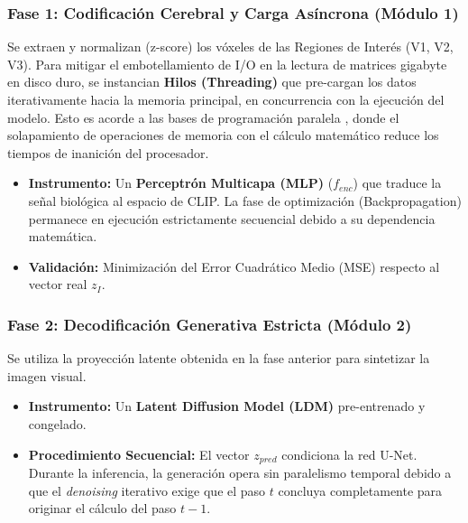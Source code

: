 \documentclass{article}
\begin{document}
\subsubsection{Fase 1: Codificación Cerebral y Carga Asíncrona (Módulo 1)}
Se extraen y normalizan (z-score) los vóxeles de las Regiones de Interés (V1, V2, V3). Para mitigar el embotellamiento de I/O en la lectura de matrices gigabyte en disco duro, se instancian \textbf{Hilos (Threading)} que pre-cargan los datos iterativamente hacia la memoria principal, en concurrencia con la ejecución del modelo. Esto es acorde a las bases de programación paralela \cite{19}, donde el solapamiento de operaciones de memoria con el cálculo matemático reduce los tiempos de inanición del procesador.
\begin{itemize}
    \item \textbf{Instrumento:} Un \textbf{Perceptrón Multicapa (MLP)} ($f_{enc}$) que traduce la señal biológica al espacio de CLIP. La fase de optimización (Backpropagation) permanece en ejecución estrictamente secuencial debido a su dependencia matemática.
    \item \textbf{Validación:} Minimización del Error Cuadrático Medio (MSE) respecto al vector real $z_I$.
\end{itemize}

\subsubsection{Fase 2: Decodificación Generativa Estricta (Módulo 2)}
Se utiliza la proyección latente obtenida en la fase anterior para sintetizar la imagen visual.
\begin{itemize}
    \item \textbf{Instrumento:} Un \textbf{Latent Diffusion Model (LDM)} pre-entrenado y congelado.
    \item \textbf{Procedimiento Secuencial:} El vector $z_{pred}$ condiciona la red U-Net. Durante la inferencia, la generación opera sin paralelismo temporal debido a que el \textit{denoising} iterativo exige que el paso $t$ concluya completamente para originar el cálculo del paso $t-1$.
\end{itemize}
\end{document}
